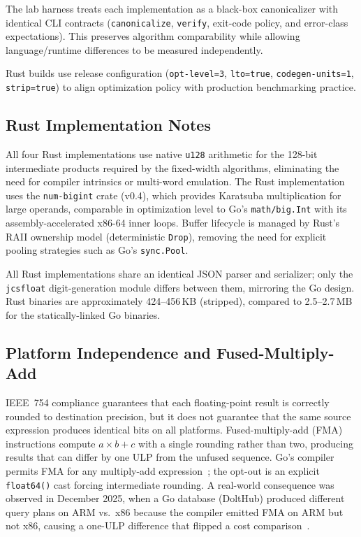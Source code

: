 The lab harness treats each implementation as a black-box canonicalizer
with identical CLI contracts (\texttt{canonicalize}, \texttt{verify},
exit-code policy, and error-class expectations).  This preserves
algorithm comparability while allowing language/runtime differences to be
measured independently.

Rust builds use release configuration (\texttt{opt-level=3},
\texttt{lto=true}, \texttt{codegen-units=1}, \texttt{strip=true}) to
align optimization policy with production benchmarking practice.

\subsection{Rust Implementation Notes}

All four Rust implementations use native \texttt{u128} arithmetic
for the 128-bit intermediate products required by the fixed-width
algorithms, eliminating the need for compiler intrinsics or multi-word
emulation.
The Rust \burgerdybvig implementation uses the \texttt{num-bigint}
crate (v0.4), which provides Karatsuba multiplication for large
operands, comparable in optimization level to Go's
\texttt{math/big.Int} with its assembly-accelerated x86-64 inner
loops.  Buffer lifecycle is managed by Rust's RAII ownership model
(deterministic \texttt{Drop}), removing the need for explicit pooling
strategies such as Go's \texttt{sync.Pool}.

All Rust implementations share an identical JSON parser and serializer;
only the \texttt{jcsfloat} digit-generation module differs between them,
mirroring the Go design.  Rust binaries are approximately 424--456\,KB
(stripped), compared to 2.5--2.7\,MB for the statically-linked Go
binaries.

\subsection{Platform Independence and Fused-Multiply-Add}

IEEE~754 compliance guarantees that each floating-point result is
correctly rounded to destination precision, but it does not guarantee
that the same source expression produces identical bits on all
platforms.  Fused-multiply-add (FMA) instructions compute $a \times b +
c$ with a single rounding rather than two, producing results that can
differ by one ULP from the unfused sequence.  Go's compiler permits FMA
for any multiply-add expression~\cite{go17895}; the opt-out is an
explicit \texttt{float64()} cast forcing intermediate rounding.  A
real-world consequence was observed in December 2025, when a Go database
(DoltHub) produced different query plans on ARM vs.\ x86 because the
compiler emitted FMA on ARM but not x86, causing a one-ULP difference
that flipped a cost comparison~\cite{dolthub2025fma}.

